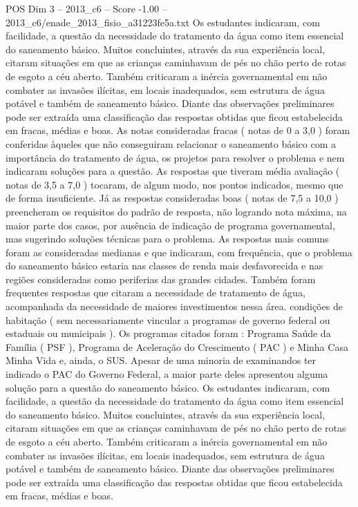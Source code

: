 \begin{textsample}{POS Dim 3 – 2013\_c6 – Score -1.00 – 2013\_c6/enade\_2013\_fisio\_a31223fe5a.txt}
Os estudantes indicaram, com facilidade, a questão da necessidade do tratamento da água como item essencial do saneamento básico.
Muitos concluintes, através da sua experiência local, citaram situações em que as crianças caminhavam de pés no chão perto de rotas de esgoto a céu aberto.
Também criticaram a inércia governamental em não combater as invasões ilícitas, em locais inadequados, sem estrutura de água potável e também de saneamento básico.
Diante das observações preliminares pode ser extraída uma classificação das respostas obtidas que ficou estabelecida em fracas, médias e boas.
As notas consideradas fracas ( notas de 0 a 3,0 ) foram conferidas àqueles que não conseguiram relacionar o saneamento básico com a importância do tratamento de água, os projetos para resolver o problema e nem indicaram soluções para a questão.
As respostas que tiveram média avaliação ( notas de 3,5 a 7,0 ) tocaram, de algum modo, nos pontos indicados, mesmo que de forma insuficiente.
Já as respostas consideradas boas ( notas de 7,5 a 10,0 ) preencheram os requisitos do padrão de resposta, não logrando nota máxima, na maior parte dos casos, por ausência de indicação de programa governamental, mas sugerindo soluções técnicas para o problema.
As respostas mais comuns foram as consideradas medianas e que indicaram, com frequência, que o problema do saneamento básico estaria nas classes de renda mais desfavorecida e nas regiões consideradas como periferias das grandes cidades.
Também foram frequentes respostas que citaram a necessidade de tratamento de água, acompanhada da necessidade de maiores investimentos nessa área. condições de habitação ( sem necessariamente vincular a programas de governo federal ou estaduais ou municipais ).
Os programas citados foram : Programa Saúde da Família ( PSF ), Programa de Aceleração do Crescimento ( PAC ) e Minha Casa Minha Vida e, ainda, o SUS.
Apesar de uma minoria de examinandos ter indicado o PAC do Governo Federal, a maior parte deles apresentou alguma solução para a questão do saneamento básico.
Os estudantes indicaram, com facilidade, a questão da necessidade do tratamento da água como item essencial do saneamento básico.
Muitos concluintes, através da sua experiência local, citaram situações em que as crianças caminhavam de pés no chão perto de rotas de esgoto a céu aberto.
Também criticaram a inércia governamental em não combater as invasões ilícitas, em locais inadequados, sem estrutura de água potável e também de saneamento básico.
Diante das observações preliminares pode ser extraída uma classificação das respostas obtidas que ficou estabelecida em fracas, médias e boas.

\end{textsample}
